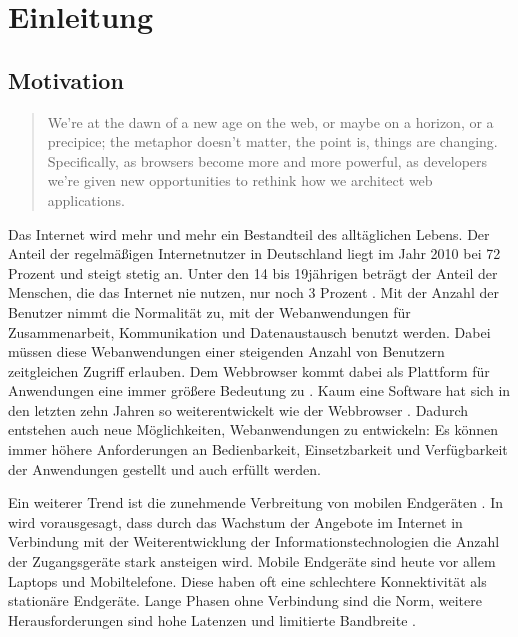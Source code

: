 \chapter{Einleitung}


\section{Motivation}
\label{sec:motivation}


\begin{quote}
We're at the dawn of a new age on the web, or maybe on a horizon, or a precipice; the metaphor doesn't matter, the point is, things are changing. Specifically, as browsers become more and more powerful, as developers we're given new opportunities to rethink how we architect web applications. 
\cite{web:architecture}
\end{quote}

Das Internet wird mehr und mehr ein Bestandteil des alltäglichen Lebens. Der Anteil der regelmäßigen Internetnutzer in Deutschland liegt im Jahr 2010 bei 72 Prozent und steigt stetig an. Unter den 14 bis 19jährigen beträgt der Anteil der Menschen, die das Internet nie nutzen, nur noch 3 Prozent . Mit der Anzahl der Benutzer nimmt die Normalität zu, mit der Webanwendungen für Zusammenarbeit, Kommunikation und Datenaustausch benutzt werden. Dabei müssen diese Webanwendungen einer steigenden Anzahl von Benutzern zeitgleichen Zugriff erlauben. Dem Webbrowser kommt dabei als Plattform für Anwendungen eine immer größere Bedeutung zu . Kaum eine Software hat sich in den letzten zehn Jahren so weiterentwickelt wie der Webbrowser . Dadurch entstehen auch neue Möglichkeiten, Webanwendungen zu entwickeln: Es können immer höhere Anforderungen an Bedienbarkeit, Einsetzbarkeit und Verfügbarkeit der Anwendungen gestellt und auch erfüllt werden.

Ein weiterer Trend ist die zunehmende Verbreitung von mobilen Endgeräten . In  wird vorausgesagt, dass durch das Wachstum der Angebote im Internet in Verbindung mit der Weiterentwicklung der Informationstechnologien die Anzahl der Zugangsgeräte stark ansteigen wird. Mobile Endgeräte sind heute vor allem Laptops und Mobiltelefone. Diese haben oft eine schlechtere Konnektivität als stationäre Endgeräte. Lange Phasen ohne Verbindung sind die Norm, weitere Herausforderungen sind hohe Latenzen und limitierte Bandbreite . 

